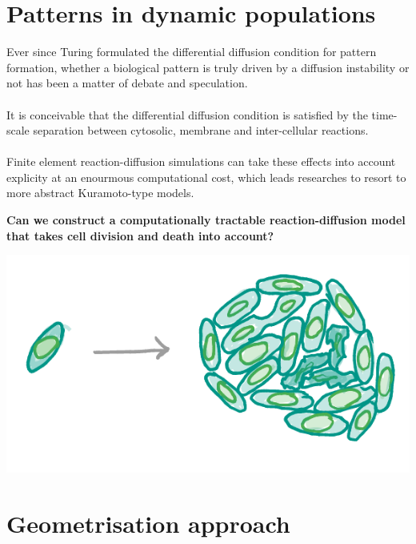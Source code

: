 \documentclass[a0,portrait]{a0poster}
\begin{document}
\begin{multicols}{3}
\section{Patterns in dynamic populations}
Ever since Turing formulated the differential diffusion condition \cite{}
for pattern formation, whether a biological pattern is truly driven by a
diffusion instability or not has been a matter of debate and speculation.
\\\\
It is conceivable that the differential diffusion condition is satisfied
by the time-scale separation between cytosolic, membrane and inter-cellular
reactions.
\\\\
Finite element reaction-diffusion simulations can take these effects into
account explicity at an enourmous computational cost, which leads researches to
resort to more abstract Kuramoto-type models.
\\
\begin{tcolorbox}[boxrule=2pt,arc=3.4pt,boxsep=2mm]
\begin{center}\color{DarkRed}
\textbf{Can we construct a computationally tractable reaction-diffusion model
that takes cell division and death into account?}
\end{center}
\end{tcolorbox}
\begin{center}
\includegraphics[width=0.9\linewidth]{population}
\end{center}
\vfill\null
\columnbreak
\section{Geometrisation approach}


\end{multicols}
\end{document}
